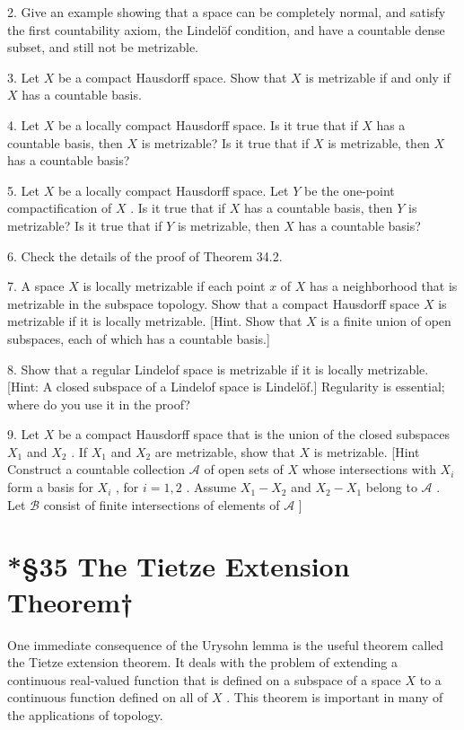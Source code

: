 \documentclass[10pt]{article}
\begin{document}
2. Give an example showing that a space can be completely normal, and satisfy the first countability axiom, the Lindelöf condition, and have a countable dense subset, and still not be metrizable.

3. Let \(X\) be a compact Hausdorff space. Show that \(X\) is metrizable if and only if \(X\) has a countable basis.

4. Let \(X\) be a locally compact Hausdorff space. Is it true that if \(X\) has a countable basis, then \(X\) is metrizable? Is it true that if \(X\) is metrizable, then \(X\) has a countable basis?

5. Let \(X\) be a locally compact Hausdorff space. Let \(Y\) be the one-point compactification of \(X\) . Is it true that if \(X\) has a countable basis, then \(Y\) is metrizable? Is it true that if \(Y\) is metrizable, then \(X\) has a countable basis?

6. Check the details of the proof of Theorem 34.2.

7. A space \(X\) is locally metrizable if each point \(x\) of \(X\) has a neighborhood that is metrizable in the subspace topology. Show that a compact Hausdorff space \(X\) is metrizable if it is locally metrizable. [Hint. Show that \(X\) is a finite union of open subspaces, each of which has a countable basis.]

8. Show that a regular Lindelof space is metrizable if it is locally metrizable. [Hint: A closed subspace of a Lindelof space is Lindelöf.] Regularity is essential; where do you use it in the proof?

9. Let \(X\) be a compact Hausdorff space that is the union of the closed subspaces \({X}_{1}\) and \({X}_{2}\) . If \({X}_{1}\) and \({X}_{2}\) are metrizable, show that \(X\) is metrizable. [Hint Construct a countable collection \(\mathcal{A}\) of open sets of \(X\) whose intersections with \({X}_{i}\) form a basis for \({X}_{i}\) , for \(i = 1,2\) . Assume \({X}_{1} - {X}_{2}\) and \({X}_{2} - {X}_{1}\) belong to \(\mathcal{A}\) . Let \(\mathcal{B}\) consist of finite intersections of elements of \(\mathcal{A}\) ]

\section*{*§35 The Tietze Extension Theorem†}

One immediate consequence of the Urysohn lemma is the useful theorem called the Tietze extension theorem. It deals with the problem of extending a continuous real-valued function that is defined on a subspace of a space \(X\) to a continuous function defined on all of \(X\) . This theorem is important in many of the applications of topology.
\end{document}
